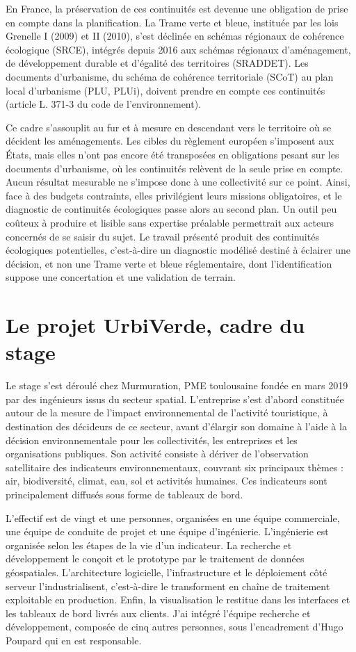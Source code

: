 \documentclass[a4paper,12pt]{report}
\begin{document}
En France, la préservation de ces continuités est devenue une obligation de prise en compte dans la planification. La Trame verte et bleue, instituée par les lois Grenelle I (2009) et II (2010), s'est déclinée en schémas régionaux de cohérence écologique (SRCE), intégrés depuis 2016 aux schémas régionaux d'aménagement, de développement durable et d'égalité des territoires (SRADDET). Les documents d'urbanisme, du schéma de cohérence territoriale (SCoT) au plan local d'urbanisme (PLU, PLUi), doivent prendre en compte ces continuités (article L. 371-3 du code de l'environnement).

Ce cadre s'assouplit au fur et à mesure en descendant vers le territoire où se décident les aménagements. Les cibles du règlement européen s'imposent aux États, mais elles n'ont pas encore été transposées en obligations pesant sur les documents d'urbanisme, où les continuités relèvent de la seule prise en compte. Aucun résultat mesurable ne s'impose donc à une collectivité sur ce point. Ainsi, face à des budgets contraints, elles privilégient leurs missions obligatoires, et le diagnostic de continuités écologiques passe alors au second plan. Un outil peu coûteux à produire et lisible sans expertise préalable permettrait aux acteurs concernés de se saisir du sujet. Le travail présenté produit des continuités écologiques potentielles, c'est-à-dire un diagnostic modélisé destiné à éclairer une décision, et non une Trame verte et bleue réglementaire, dont l'identification suppose une concertation et une validation de terrain.

\section{Le projet UrbiVerde, cadre du stage}
Le stage s'est déroulé chez Murmuration, PME toulousaine fondée en mars 2019 par des ingénieurs issus du secteur spatial. L'entreprise s'est d'abord constituée autour de la mesure de l'impact environnemental de l'activité touristique, à destination des décideurs de ce secteur, avant d'élargir son domaine à l'aide à la décision environnementale pour les collectivités, les entreprises et les organisations publiques. Son activité consiste à dériver de l'observation satellitaire des indicateurs environnementaux, couvrant six principaux thèmes : air, biodiversité, climat, eau, sol et activités humaines. Ces indicateurs sont principalement diffusés sous forme de tableaux de bord.

L'effectif est de vingt et une personnes, organisées en une équipe commerciale, une équipe de conduite de projet et une équipe d'ingénierie. L'ingénierie est organisée selon les étapes de la vie d'un indicateur. La recherche et développement le conçoit et le prototype par le traitement de données géospatiales. L'architecture logicielle, l'infrastructure et le déploiement côté serveur l'industrialisent, c'est-à-dire le transforment en chaîne de traitement exploitable en production. Enfin, la visualisation le restitue dans les interfaces et les tableaux de bord livrés aux clients. J'ai intégré l'équipe recherche et développement, composée de cinq autres personnes, sous l'encadrement d'Hugo Poupard qui en est responsable.
\end{document}
